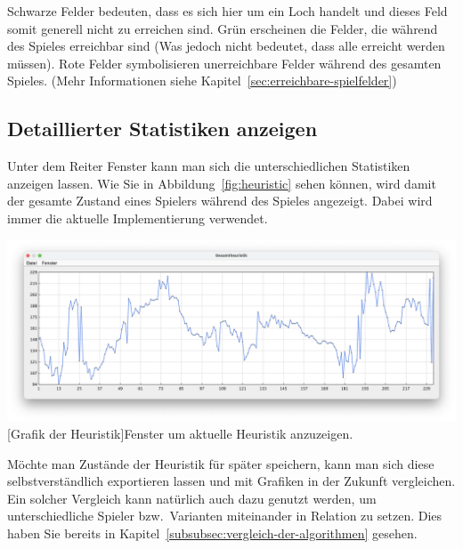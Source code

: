 Schwarze Felder bedeuten, dass es sich hier um ein Loch handelt und dieses Feld somit generell nicht zu erreichen sind.
Gr\"un erscheinen die Felder, die w\"ahrend des Spieles erreichbar sind (Was jedoch nicht bedeutet, dass alle erreicht werden m\"ussen).
Rote Felder symbolisieren unerreichbare Felder w\"ahrend des gesamten Spieles.
(Mehr Informationen siehe Kapitel~\ref{sec:erreichbare-spielfelder})

\subsection{Detaillierter Statistiken anzeigen}\label{subsec:detaillierter-statistiken-anzeigen}
Unter dem Reiter Fenster kann man sich die unterschiedlichen Statistiken anzeigen lassen.
Wie Sie in Abbildung~\ref{fig:heuristic} sehen k\"onnen, wird damit der gesamte Zustand eines Spielers w\"ahrend des Spieles angezeigt.
Dabei wird immer die aktuelle Implementierung verwendet.

\vspace{1em}
\begin{minipage}{\linewidth}
    \centering
    \includegraphics[width=0.8\linewidth]{pics/heuristic}
    [Grafik der Heuristik]{Fenster um aktuelle Heuristik anzuzeigen.}
    \label{fig:heuristic}
\end{minipage}
\vspace{1em}

M\"ochte man Zust\"ande der Heuristik f\"ur sp\"ater speichern, kann man sich diese selbstverst\"andlich exportieren lassen und mit Grafiken in der Zukunft vergleichen.
Ein solcher Vergleich kann nat\"urlich auch dazu genutzt werden, um unterschiedliche Spieler bzw.\ Varianten miteinander in Relation zu setzen.
Dies haben Sie bereits in Kapitel~\ref{subsubsec:vergleich-der-algorithmen} gesehen.

